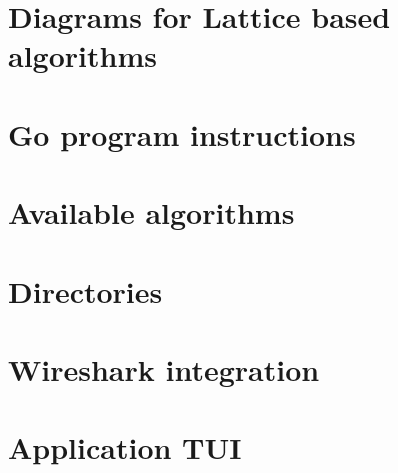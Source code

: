 \chapter{Diagrams for Lattice based algorithms}
\label{ch:block_diagrams}


\chapter{Go program instructions}
\label{ch:go_instructions}


\chapter{Available algorithms}
\label{ch:available_algs}


\chapter{Directories}
\label{ch:directories_app}


\chapter{Wireshark integration}
\label{ch:wireshark}


\chapter{Application TUI}
\label{ch:TUI_example}

